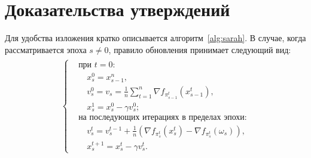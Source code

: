 \section{Доказательства утверждений}
Для удобства изложения кратко описывается алгоритм~\ref{alg:sarah}. В случае, когда рассматривается эпоха $s \neq 0$, правило обновления принимает следующий вид:
\begin{align}
\label{sarah:update}
\begin{split}
\begin{cases}
    &\text{при } t = 0\text{:}\\
    &\quad x_s^0 = x_{s-1}^{n},\\
    &\quad v_s^0 = v_s = \frac{1}{n}\sum\limits_{t = 1}^n \nabla f_{\pi_{s-1}^t} (x_{s-1}^t),\\
    &\quad x_s^1 = x_s^0 - \gamma v_s^0;\\
    &\text{на последующих итерациях в пределах эпохи:}\\
    &\quad v_s^t = v_s^{t-1} + \frac{1}{n} \left(\nabla f_{\pi_{s}^t} (x_s^t) - \nabla f_{\pi_{s}^t} (\omega_s)\right),\\
    &\quad x_s^{t+1} = x_s^t - \gamma v_s^t.
\end{cases}
\end{split}
\end{align}
